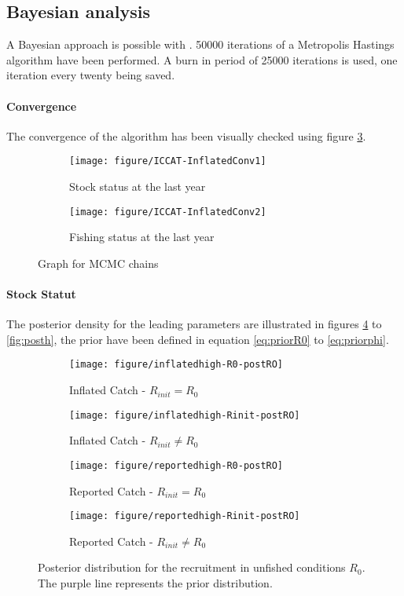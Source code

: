 \subsection{Bayesian analysis}
A Bayesian approach is possible with \iscam. 50000 iterations of a Metropolis Hastings algorithm have been performed. 
A burn in period of 25000 iterations is used, one iteration every twenty being saved.  
\paragraph{Convergence}
The convergence of the algorithm has been  visually checked using figure \ref{fig:mcmcdiag}. 

\begin{figure}[htbp]
 \begin{subfigure}[b]{0.45\textwidth}
 \texttt{[image: figure/ICCAT-InflatedConv1]}
  \caption{Stock status at the last year}
                \label{fig:mcmcstock}
  \end{subfigure}
 \begin{subfigure}[b]{0.45\textwidth} 
 \texttt{[image: figure/ICCAT-InflatedConv2]}
\caption{Fishing status at the last year}
                \label{fig:mcmcfish}
  \end{subfigure}
  \caption{Graph for MCMC chains}
  \label{fig:mcmcdiag}
 \end{figure}

\paragraph{Stock Statut}
The posterior density for the leading parameters are illustrated in figures \ref{fig:postR0} to \ref{fig:posth},
the prior have been defined in equation \ref{eq:priorR0} to \ref{eq:priorphi}.


\begin{figure}[htbp]
 \begin{subfigure}[b]{0.45\textwidth}
 \texttt{[image: figure/inflatedhigh-R0-postRO]}
  \caption{Inflated Catch - $R_{init}=R_0$}
  \end{subfigure} \hfill
 \begin{subfigure}[b]{0.45\textwidth} 
 \texttt{[image: figure/inflatedhigh-Rinit-postRO]}
  \caption{Inflated Catch - $R_{init}\ne R_0$}
  \end{subfigure}
 \begin{subfigure}[b]{0.45\textwidth}
 \texttt{[image: figure/reportedhigh-R0-postRO]}
  \caption{Reported Catch - $R_{init}=R_0$}
  \end{subfigure} \hfill
 \begin{subfigure}[b]{0.45\textwidth} 
 \texttt{[image: figure/reportedhigh-Rinit-postRO]}
  \caption{Reported Catch - $R_{init}\ne R_0$}
  \end{subfigure}
  \caption{Posterior distribution for the recruitment in unfished conditions $R_0$. The purple line represents the prior distribution.}
  \label{fig:postR0}
 \end{figure}

